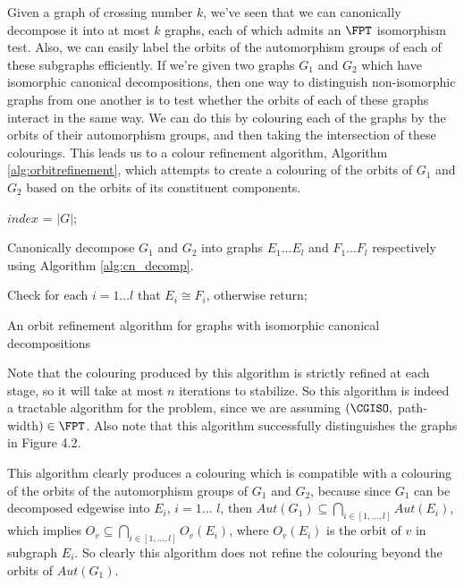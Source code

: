 \documentclass[11pt]{report}
\begin{document}
Given a graph of crossing number $k$, we've seen that we can canonically decompose it into at most $k$ graphs, each of which admits an $\FPT$ isomorphism test. Also, we can easily label the orbits of the automorphism groups of each of these subgraphs efficiently. If we're given two graphs $G_1$ and $G_2$  which have isomorphic canonical decompositions, then one way to distinguish non-isomorphic graphs from one another is to test whether the orbits of each of these graphs interact in the same way. We can do this by colouring each of the graphs by the orbits of their automorphism groups, and then taking the  intersection of these colourings. This leads us to a colour refinement algorithm, Algorithm \ref{alg:orbitrefinement}, which attempts to create a colouring of the orbits of $G_1$ and $G_2$ based on the orbits of its constituent components.




\begin{algorithm}[h]
\SetAlgoNoLine
{}
$index$ = $|G|$; 

Canonically decompose $G_1$ and $G_2$ into graphs $E_1$...$E_l$ and $F_1$...$F_l$ respectively using Algorithm \ref{alg:cn_decomp}.

Check for each $i=1$...$l$ that $E_i \cong F_i$, otherwise return;

\caption{An orbit refinement algorithm for graphs with isomorphic canonical decompositions}
\label{alg:orbitrefinement}
\end{algorithm}

Note that the colouring produced by this algorithm is strictly refined at each stage, so it will take at most $n$ iterations to stabilize. So this algorithm is indeed a tractable algorithm for the problem, since we are assuming $(\CGISO,$ path-width$)\in \FPT$. Also note that this algorithm successfully distinguishes the graphs in Figure 4.2.

This algorithm clearly produces a colouring which is compatible with a colouring of the orbits of the automorphism groups of $G_1$ and $G_2$, because since $G_1$ can be decomposed edgewise into $E_i$, $i=1$... $l$, then $Aut(G_1) \subseteq \displaystyle\bigcap_{i\in [1,...,l]} Aut(E_i)$, which implies $O_v \subseteq \displaystyle\bigcap_{i\in [1,...,l]} O_v(E_i)$, where $O_v(E_i)$ is the orbit of $v$ in subgraph $E_i$. So clearly this algorithm does not refine the colouring beyond the orbits of $Aut(G_1)$.
\end{document}
